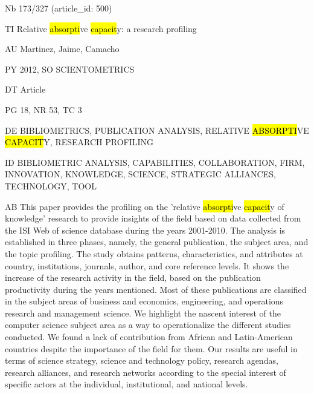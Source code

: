 \documentclass[a4paper]{article}
\begin{document}
\vspace*{-2cm}
Nb \tabto{0cm}173/327 (article\_id: 500)\par
TI \tabto{0cm}Relative \hl{absorpti}ve \hl{capacit}y: a research profiling\par
AU \tabto{0cm}Martinez, Jaime, Camacho\par
PY \tabto{0cm}2012, SO SCIENTOMETRICS\par
DT \tabto{0cm}Article\par
PG \tabto{0cm}18, NR 53, TC 3\par
DE \tabto{0cm}BIBLIOMETRICS, PUBLICATION ANALYSIS, RELATIVE \hl{ABSORPTI}VE \hl{CAPACIT}Y, RESEARCH PROFILING\par
ID \tabto{0cm}BIBLIOMETRIC ANALYSIS, CAPABILITIES, COLLABORATION, FIRM, INNOVATION, KNOWLEDGE, SCIENCE, STRATEGIC ALLIANCES, TECHNOLOGY, TOOL\par
AB \tabto{0cm}This paper provides the profiling on the 'relative \hl{absorpti}ve \hl{capacit}y of knowledge' research to provide insights of the field based on data collected from the ISI Web of science database during the years 2001-2010. The analysis is established in three phases, namely, the general publication, the subject area, and the topic profiling. The study obtains patterns, characteristics, and attributes at country, institutions, journals, author, and core reference levels. It shows the increase of the research activity in the field, based on the publication productivity during the years mentioned. Most of these publications are classified in the subject areas of business and economics, engineering, and operations research and management science. We highlight the nascent interest of the computer science subject area as a way to operationalize the different studies conducted. We found a lack of contribution from African and Latin-American countries despite the importance of the field for them. Our results are useful in terms of science strategy, science and technology policy, research agendas, research alliances, and research networks according to the special interest of specific actors at the individual, institutional, and national levels.\par
\clearpage
\end{document}
